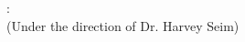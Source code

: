 
%
%
%
\vspace{-1.5\baselineskip}

\begin{singlespace}
\begin{center}
\docAuthorFull: \docTitle\\
(Under the direction of Dr. Harvey Seim)
\end{center}
\end{singlespace}
\vspace{-0.5\baselineskip}


